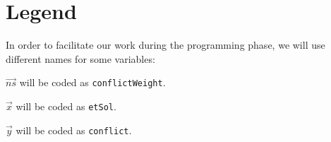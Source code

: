 \section*{Legend}
In order to facilitate our work during the programming phase, we will use different names for some variables:

$ \vec{ns} $ will be coded as \verb!conflictWeight!.

$ \vec{x} $ will be coded as \verb!etSol!.

$ \vec{y} $ will be coded as \verb!conflict!.
